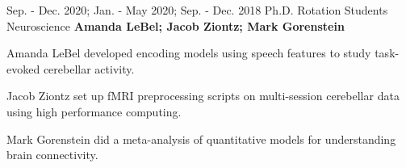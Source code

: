 \begin{cventries}
  \cventry
    {Sep. - Dec. 2020; Jan. - May 2020; Sep. - Dec. 2018} %
    {Ph.D. Rotation Students} %
    {Neuroscience}
    {\textbf{Amanda LeBel; Jacob Ziontz; Mark Gorenstein}}
   {
      \begin{cvitems} %
        \item {Amanda LeBel developed encoding models using speech features to study task-evoked cerebellar activity.}
        \item {Jacob Ziontz set up fMRI preprocessing scripts on multi-session cerebellar data using high performance computing.}
        \item {Mark Gorenstein did a meta-analysis of quantitative models for understanding brain connectivity.}
      \end{cvitems}
    }
    

\end{cventries}

